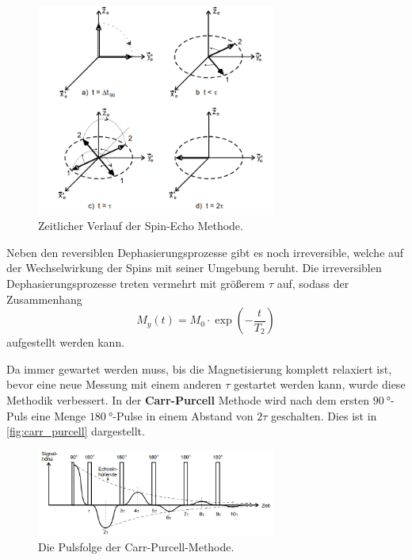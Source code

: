         \begin{figure}
            \centering
            \includegraphics[width=0.7\textwidth]{latex/images/Hahn_echo.png}
            \caption{Zeitlicher Verlauf der Spin-Echo Methode. \cite{finke}}
            \label{fig:hahn}
        \end{figure}

        \noindent Neben den reversiblen Dephasierungsprozesse gibt es noch irreversible, welche auf der Wechselwirkung der Spins mit seiner Umgebung beruht. Die irreversiblen Dephasierungsprozesse 
        treten vermehrt mit größerem $\tau$ auf, sodass der Zusammenhang 
        \begin{equation}
            M_y(t) = M_0 \cdot \exp(-\frac{t}{T_2})
            \label{eqn:expT_2}
        \end{equation}
        aufgestellt werden kann. 
        
        \noindent Da immer gewartet werden muss, bis die Magnetisierung komplett relaxiert ist, bevor eine neue Messung mit einem anderen $\tau$ gestartet werden kann, wurde diese Methodik verbessert. 
        In der \textbf{Carr-Purcell} Methode wird nach dem ersten $\SI{90}{\degree}$-Puls eine Menge $\SI{180}{\degree}$-Pulse in einem Abstand von $2\tau$ geschalten. Dies ist in \autoref{fig:carr_purcell}
        dargestellt. 

        \begin{figure}
            \centering
            \includegraphics[width=0.7\textwidth]{latex/images/Carr_Purcell.png}
            \caption{Die Pulsfolge der Carr-Purcell-Methode. \cite{finke}}
            \label{fig:carr_purcell}
        \end{figure}


